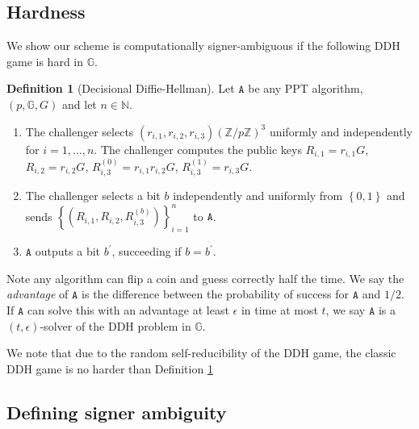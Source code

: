\documentclass{article}
\theoremstyle{plain}
\theoremstyle{definition}
\newtheorem{defn}{Definition}[section]
\begin{document}
\subsection{Hardness}

We show our scheme is computationally signer-ambiguous if the following DDH game is hard in $\mathbb{G}$.

\begin{defn}[Decisional Diffie-Hellman]\label{ddhgame} Let $\texttt{A}$ be any PPT algorithm, $(p, \mathbb{G}, G)$ and let $n \in \mathbb{N}$.
\begin{enumerate}
\item The challenger selects $(r_{i,1}, r_{i,2}, r_{i,3}) \left(\mathbb{Z}/p\mathbb{Z}\right)^3$ uniformly and independently for $i=1, \ldots, n$. The challenger computes the public keys $R_{i,1} = r_{i,1} G$, $R_{i,2} = r_{i,2}G$, $R_{i,3}^{(0)} = r_{i,1} r_{i,2} G$, $R_{i,3}^{(1)} = r_{i,3} G$.

\item The challenger selects a bit $b$ independently and uniformly from $\left\{0,1\right\}$ and sends $\left\{(R_{i,1}, R_{i,2}, R_{i,3}^{(b)})\right\}_{i=1}^{n}$ to $\texttt{A}$.

\item $\texttt{A}$ outputs a bit $b^\prime$, succeeding if $b = b^\prime$.
\end{enumerate}

Note any algorithm can flip a coin and guess correctly half the time. We say the \textit{advantage} of $\texttt{A}$ is the difference between the probability of success for $\texttt{A}$ and $1/2$. If $\texttt{A}$ can solve this with an advantage at least $\epsilon$ in time at most $t$, we say $\texttt{A}$ is a $(t,\epsilon)$-solver of the DDH problem in $\mathbb{G}$. 

\end{defn}


We note that due to the random self-reducibility of the DDH game, the classic DDH game is no harder than Definition \ref{ddhgame}
\subsection{Defining signer ambiguity}
\end{document}
